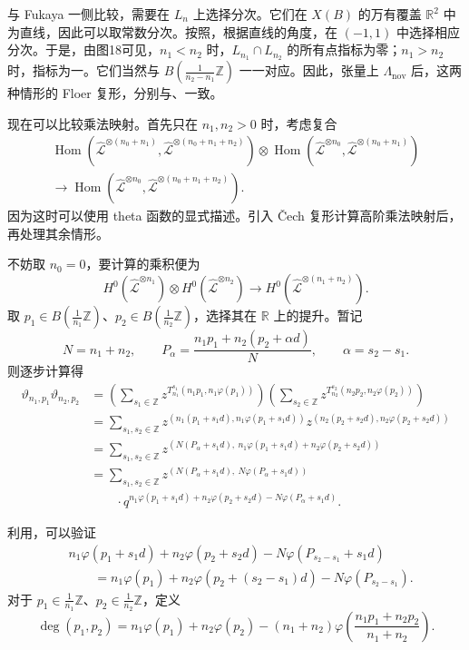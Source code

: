 与 Fukaya 一侧比较，需要在 $L_n$ 上选择分次。它们在 $X(B)$ 的万有覆盖 $\mathbb R^2$ 中为直线，因此可以取常数分次。按照，根据直线的角度，在 $(-1,1)$ 中选择相应分次。于是，由图18可见，$n_1<n_2$ 时，$L_{n_1}\cap L_{n_2}$ 的所有点指标为零；$n_1>n_2$ 时，指标为一。它们当然与 $B(\tfrac1{n_2-n_1}\mathbb Z)$ 一一对应。因此，张量上 $\Lambda_{\mathrm{nov}}$ 后，这两种情形的 Floer 复形，分别与、一致。

现在可以比较乘法映射。首先只在 $n_1,n_2>0$ 时，考虑复合
\[
\begin{aligned}
\operatorname{Hom}(\widehat{\mathcal L}^{\otimes(n_0+n_1)},
\widehat{\mathcal L}^{\otimes(n_0+n_1+n_2)})
\otimes\operatorname{Hom}(\widehat{\mathcal L}^{\otimes n_0},
\widehat{\mathcal L}^{\otimes(n_0+n_1)})\\
\longrightarrow
\operatorname{Hom}(\widehat{\mathcal L}^{\otimes n_0},
\widehat{\mathcal L}^{\otimes(n_0+n_1+n_2)}).
\end{aligned}
\]
因为这时可以使用 theta 函数的显式描述。引入 Čech 复形计算高阶乘法映射后，再处理其余情形。

不妨取 $n_0=0$，要计算的乘积便为
\[
H^0(\widehat{\mathcal L}^{\otimes n_1})
\otimes H^0(\widehat{\mathcal L}^{\otimes n_2})
\longrightarrow H^0(\widehat{\mathcal L}^{\otimes(n_1+n_2)}).
\]
取 $p_1\in B(\tfrac1{n_1}\mathbb Z)$、$p_2\in B(\tfrac1{n_2}\mathbb Z)$，选择其在 $\mathbb R$ 上的提升。暂记
\[
N=n_1+n_2,\qquad
P_\alpha=\frac{n_1p_1+n_2(p_2+\alpha d)}N,
\qquad\alpha=s_2-s_1.
\]
则逐步计算得
\[
\begin{aligned}
\vartheta_{n_1,p_1}\vartheta_{n_2,p_2}
&=\left(\sum_{s_1\in\mathbb Z}z^{T_{n_1}^{s_1}(n_1p_1,n_1\varphi(p_1))}\right)
\left(\sum_{s_2\in\mathbb Z}z^{T_{n_2}^{s_2}(n_2p_2,n_2\varphi(p_2))}\right)\\
&=\sum_{s_1,s_2\in\mathbb Z}
z^{(n_1(p_1+s_1d),n_1\varphi(p_1+s_1d))}
z^{(n_2(p_2+s_2d),n_2\varphi(p_2+s_2d))}\\
&=\sum_{s_1,s_2\in\mathbb Z}
z^{(N(P_\alpha+s_1d),\ n_1\varphi(p_1+s_1d)+n_2\varphi(p_2+s_2d))}\\
&=\sum_{s_1,s_2\in\mathbb Z}
z^{(N(P_\alpha+s_1d),\ N\varphi(P_\alpha+s_1d))}\\
&\qquad\cdot
q^{n_1\varphi(p_1+s_1d)+n_2\varphi(p_2+s_2d)-N\varphi(P_\alpha+s_1d)}.
\end{aligned}
\]

利用，可以验证
\[
\begin{aligned}
&n_1\varphi(p_1+s_1d)+n_2\varphi(p_2+s_2d)
-N\varphi(P_{s_2-s_1}+s_1d)\\
&\qquad=n_1\varphi(p_1)+n_2\varphi(p_2+(s_2-s_1)d)
-N\varphi(P_{s_2-s_1}).
\end{aligned}
\]
对于 $p_1\in\tfrac1{n_1}\mathbb Z$、$p_2\in\tfrac1{n_2}\mathbb Z$，定义
\[
\deg(p_1,p_2)=n_1\varphi(p_1)+n_2\varphi(p_2)
-(n_1+n_2)\varphi\left(\frac{n_1p_1+n_2p_2}{n_1+n_2}\right).
\]


